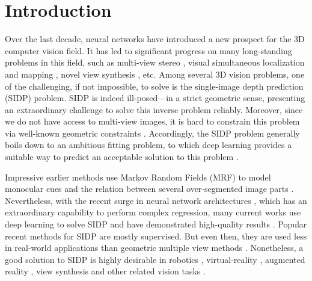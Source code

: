 \documentclass{article} \usepackage{iclr2023_conference, times}
\begin{document}
\section{Introduction}
Over the last decade, neural networks have introduced a new prospect for the 3D computer vision field. It has led to significant progress on many long-standing problems in this field, such as multi-view stereo \citep{huang2018deepmvs,kaya2022uncertainty},  visual simultaneous localization and mapping \citep{teed2021droid}, novel view synthesis \citep{mildenhall2021nerf}, etc. Among several 3D vision problems, one of the challenging, if not impossible, to solve is the single-image depth prediction (SIDP) problem. SIDP is indeed ill-posed---in a strict geometric sense, presenting an extraordinary challenge to solve this inverse problem reliably. Moreover, since we do not have access to multi-view images, it is hard to constrain this problem via well-known geometric constraints \citep{longuet1981computer, nister2004efficient, furukawa2009accurate, kumar2019superpixel, kumar2017monocular}. Accordingly, the SIDP problem generally boils down to an ambitious fitting problem, to which deep learning provides a suitable way to predict an acceptable solution to this problem \citep{yuan2022new, yin2019enforcing}.

Impressive earlier methods use Markov Random Fields (MRF) to model monocular cues and the relation between several over-segmented image parts \citep{saxena2007learning, saxena2008make3d}. Nevertheless, with the recent surge in neural network architectures \citep{krizhevsky2012imagenet, simonyan2014very, he2016deep}, which has an extraordinary capability to perform complex regression, many current works use deep learning to solve SIDP and have demonstrated high-quality results \citep{yuan2022new, aich2021bidirectional, bhat2021adabins, eigen2014depth, fu2018deep, lee2019big, lee2021patch}. Popular recent methods for SIDP are mostly supervised. But even then, they are used less in real-world applications than geometric multiple view methods \citep{labbe2019rtab, muller2022instant}. Nonetheless, a good solution to SIDP is highly desirable in robotics \citep{yang2020d3vo}, virtual-reality \citep{hoiem2005automatic},  augmented reality \citep{du2020depthlab}, view synthesis \citep{hoiem2005automatic} and other related vision tasks \citep{liu2019dense}.
\end{document}
